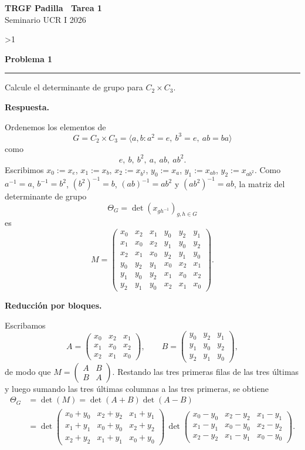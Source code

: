 \documentclass[10pt,a4paper]{article}
\newcommand{\inlinehead}[2][repblue]{%
  \par\smallskip
  {\color{#1}\bfseries #2.}\hspace{0.45em}%
}
\newcommand{\blockhead}[2][repteal]{%
  \par\smallskip
  {\color{#1}\bfseries #2.}\par\nobreak\smallskip
}
\newcommand{\answer}{\inlinehead{Respuesta}}
\newcommand{\subhead}[1]{\blockhead{#1}}
\newcommand{\topbanner}{%
  \begin{tcolorbox}[
    colback=replight,
    colframe=repline,
    borderline west={1.2pt}{0pt}{repblue},
    borderline east={1.2pt}{0pt}{repteal},
    left=1.0em,
    right=1.0em,
    top=0.7em,
    bottom=0.55em
  ]
    {\Large\bfseries\color{repblue} TRGF Padilla \textemdash\ Tarea 1}\\[-0.1em]
    {\normalsize\color{repteal} Seminario UCR I 2026}
  \end{tcolorbox}
}
\newcounter{probcnt}
\newcommand{\problem}[2]{%
  \stepcounter{probcnt}%
  \ifnum\value{probcnt}>1\newpage\fi
  \par\vspace{0.25em}
  {\large\bfseries\color{repblue} Problema #1}\par
  {\color{repline}\rule{\linewidth}{0.55pt}}\par
  \begin{tcolorbox}[
    breakable,
    colback=white,
    colframe=repline,
    borderline west={1.6pt}{0pt}{repteal},
    left=0.7em,
    right=0.7em,
    top=0.35em,
    bottom=0.3em,
    before skip=0.35em,
    after skip=0.45em
  ]
    #2
  \end{tcolorbox}
}
\begin{document}
\color{black}
\topbanner
\small

\problem{1}{%
Calcule el determinante de grupo para $C_2 \times C_3$.
}

\answer
\begingroup
\fontsize{8.8}{10.2}\selectfont
\setlength{\abovedisplayskip}{0.28em}
\setlength{\belowdisplayskip}{0.28em}
\setlength{\abovedisplayshortskip}{0.18em}
\setlength{\belowdisplayshortskip}{0.18em}
\setlength{\arraycolsep}{3.2pt}
\renewcommand{\arraystretch}{0.96}

Ordenemos los elementos de
\[
  G=C_2 \times C_3=\langle a,b : a^2=e,\ b^3=e,\ ab=ba\rangle
\]
como
\[
  e,\ b,\ b^2,\ a,\ ab,\ ab^2.
\]
Escribimos $x_0:=x_e$, $x_1:=x_b$, $x_2:=x_{b^2}$, $y_0:=x_a$,
$y_1:=x_{ab}$, $y_2:=x_{ab^2}$. Como $a^{-1}=a$, $b^{-1}=b^2$,
$(b^2)^{-1}=b$, $(ab)^{-1}=ab^2$ y $(ab^2)^{-1}=ab$,
la matriz del determinante de grupo
\[
  \Theta_G=\det(x_{gh^{-1}})_{g,h\in G}
\]
es
\[
  M=
  \begin{pmatrix}
    x_0 & x_2 & x_1 & y_0 & y_2 & y_1\\
    x_1 & x_0 & x_2 & y_1 & y_0 & y_2\\
    x_2 & x_1 & x_0 & y_2 & y_1 & y_0\\
    y_0 & y_2 & y_1 & x_0 & x_2 & x_1\\
    y_1 & y_0 & y_2 & x_1 & x_0 & x_2\\
    y_2 & y_1 & y_0 & x_2 & x_1 & x_0
  \end{pmatrix}.
\]

\subhead{Reducción por bloques}
Escribamos
\[
  A=
  \begin{pmatrix}
    x_0 & x_2 & x_1\\
    x_1 & x_0 & x_2\\
    x_2 & x_1 & x_0
  \end{pmatrix},
  \qquad
  B=
  \begin{pmatrix}
    y_0 & y_2 & y_1\\
    y_1 & y_0 & y_2\\
    y_2 & y_1 & y_0
  \end{pmatrix},
\]
de modo que $M=\begin{pmatrix}A&B\\ B&A\end{pmatrix}$. Restando las tres
primeras filas de las tres últimas y luego sumando las tres últimas columnas a
las tres primeras, se obtiene
\begin{align*}
  \Theta_G
  &=\det(M)=\det(A+B)\det(A-B) \\
  &= \det
  \begin{pmatrix}
    x_0+y_0 & x_2+y_2 & x_1+y_1\\
    x_1+y_1 & x_0+y_0 & x_2+y_2\\
    x_2+y_2 & x_1+y_1 & x_0+y_0
  \end{pmatrix}
  \,\det
  \begin{pmatrix}
    x_0-y_0 & x_2-y_2 & x_1-y_1\\
    x_1-y_1 & x_0-y_0 & x_2-y_2\\
    x_2-y_2 & x_1-y_1 & x_0-y_0
  \end{pmatrix}.
\end{align*}
\end{document}
